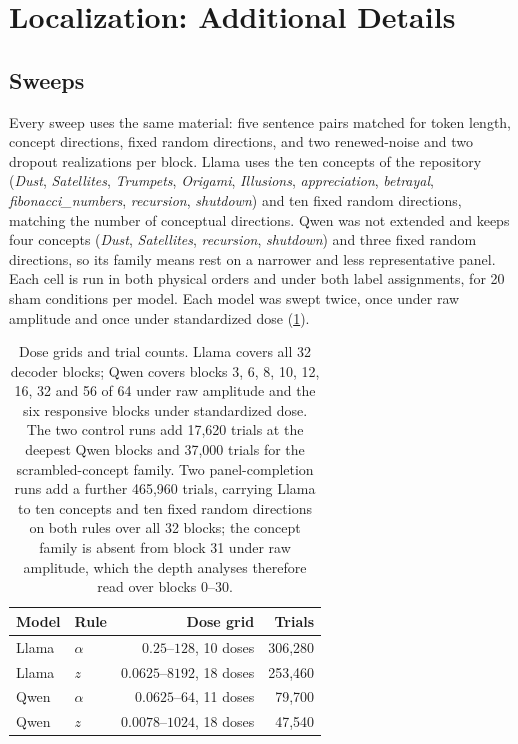 
\section{Localization: Additional Details}
\label{app:localization}

\subsection{Sweeps}
\label{app:loc-design}

Every sweep uses the same material: five sentence pairs matched for token
length, concept directions, fixed random directions, and two renewed-noise and
two dropout realizations per block. Llama uses the ten concepts of the
repository (\emph{Dust}, \emph{Satellites}, \emph{Trumpets}, \emph{Origami},
\emph{Illusions}, \emph{appreciation}, \emph{betrayal},
\emph{fibonacci\_numbers}, \emph{recursion}, \emph{shutdown}) and ten fixed
random directions, matching the number of conceptual directions. Qwen was not
extended and keeps four concepts (\emph{Dust}, \emph{Satellites},
\emph{recursion}, \emph{shutdown}) and three fixed random directions, so its
family means rest on a narrower and less representative panel. Each cell is run in both
physical orders and under both label assignments, for 20 sham conditions per
model. Each model was swept twice, once under raw amplitude and once under
standardized dose (\cref{tab:app-loc-trials}).

\begin{table}[H]
\centering
\small
\begin{tabular}{llrr}
\toprule
Model & Rule & Dose grid & Trials \\
\midrule
Llama & $\alpha$ & $0.25$--$128$, 10 doses & 306,280 \\
Llama & $z$ & $0.0625$--$8192$, 18 doses & 253,460 \\
Qwen & $\alpha$ & $0.0625$--$64$, 11 doses & 79,700 \\
Qwen & $z$ & $0.0078$--$1024$, 18 doses & 47,540 \\
\bottomrule
\end{tabular}
\caption{Dose grids and trial counts. Llama covers all 32 decoder blocks;
Qwen covers blocks 3, 6, 8, 10, 12, 16, 32 and 56 of 64 under raw amplitude
and the six responsive blocks under standardized dose. The two control runs
add 17,620 trials at the deepest Qwen blocks and 37,000 trials for the
scrambled-concept family. Two panel-completion runs add a further 465,960
trials, carrying Llama to ten concepts and ten fixed random directions on both
rules over all 32 blocks; the concept family is absent from block 31 under raw
amplitude, which the depth analyses therefore read over blocks 0--30.}
\label{tab:app-loc-trials}
\end{table}

